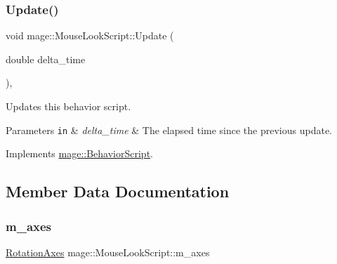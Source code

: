 \hypertarget{classmage_1_1_mouse_look_script_a7962403a78c02b2fe64e8f06f6319312}{}\label{classmage_1_1_mouse_look_script_a7962403a78c02b2fe64e8f06f6319312} 
\subsubsection{\texorpdfstring{Update()}{Update()}}
{\footnotesize\ttfamily void mage\+::\+Mouse\+Look\+Script\+::\+Update (\begin{DoxyParamCaption}\item[{double}]{delta\+\_\+time }\end{DoxyParamCaption})\hspace{0.3cm}{\ttfamily [override]}, {\ttfamily [virtual]}}

Updates this behavior script.


\begin{DoxyParams}[1]{Parameters}
\mbox{\tt in}  & {\em delta\+\_\+time} & The elapsed time since the previous update. \\
\hline
\end{DoxyParams}


Implements \hyperlink{classmage_1_1_behavior_script_a905b6c83640cb91d19fecab3435f6feb}{mage\+::\+Behavior\+Script}.



\subsection{Member Data Documentation}
\hypertarget{classmage_1_1_mouse_look_script_ab5df1b96d5860a9b8f30256e7c89b26b}{}\label{classmage_1_1_mouse_look_script_ab5df1b96d5860a9b8f30256e7c89b26b} 
\subsubsection{\texorpdfstring{m\+\_\+axes}{m\_axes}}
{\footnotesize\ttfamily \hyperlink{namespacemage_a548e5c31b08a1078841ed21948f5bf4c}{Rotation\+Axes} mage\+::\+Mouse\+Look\+Script\+::m\+\_\+axes\hspace{0.3cm}{\ttfamily [private]}}

\hypertarget{classmage_1_1_mouse_look_script_a07c9a61869dab687a0426fa0c4b41fa7}{}\label{classmage_1_1_mouse_look_script_a07c9a61869dab687a0426fa0c4b41fa7} 
